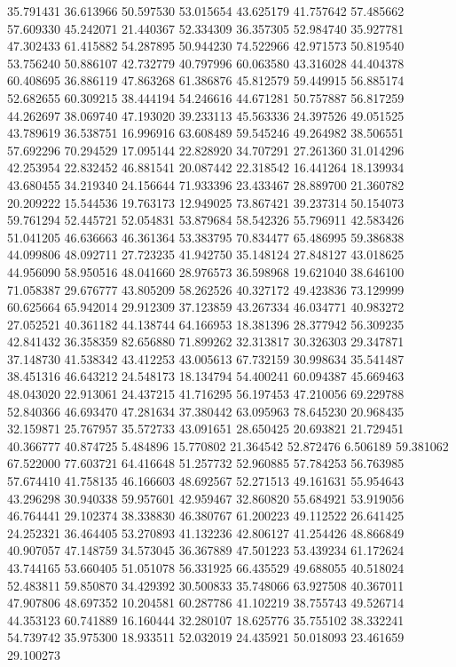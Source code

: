 35.791431
36.613966
50.597530
53.015654
43.625179
41.757642
57.485662
57.609330
45.242071
21.440367
52.334309
36.357305
52.984740
35.927781
47.302433
61.415882
54.287895
50.944230
74.522966
42.971573
50.819540
53.756240
50.886107
42.732779
40.797996
60.063580
43.316028
44.404378
60.408695
36.886119
47.863268
61.386876
45.812579
59.449915
56.885174
52.682655
60.309215
38.444194
54.246616
44.671281
50.757887
56.817259
44.262697
38.069740
47.193020
39.233113
45.563336
24.397526
49.051525
43.789619
36.538751
16.996916
63.608489
59.545246
49.264982
38.506551
57.692296
70.294529
17.095144
22.828920
34.707291
27.261360
31.014296
42.253954
22.832452
46.881541
20.087442
22.318542
16.441264
18.139934
43.680455
34.219340
24.156644
71.933396
23.433467
28.889700
21.360782
20.209222
15.544536
19.763173
12.949025
73.867421
39.237314
50.154073
59.761294
52.445721
52.054831
53.879684
58.542326
55.796911
42.583426
51.041205
46.636663
46.361364
53.383795
70.834477
65.486995
59.386838
44.099806
48.092711
27.723235
41.942750
35.148124
27.848127
43.018625
44.956090
58.950516
48.041660
28.976573
36.598968
19.621040
38.646100
71.058387
29.676777
43.805209
58.262526
40.327172
49.423836
73.129999
60.625664
65.942014
29.912309
37.123859
43.267334
46.034771
40.983272
27.052521
40.361182
44.138744
64.166953
18.381396
28.377942
56.309235
42.841432
36.358359
82.656880
71.899262
32.313817
30.326303
29.347871
37.148730
41.538342
43.412253
43.005613
67.732159
30.998634
35.541487
38.451316
46.643212
24.548173
18.134794
54.400241
60.094387
45.669463
48.043020
22.913061
24.437215
41.716295
56.197453
47.210056
69.229788
52.840366
46.693470
47.281634
37.380442
63.095963
78.645230
20.968435
32.159871
25.767957
35.572733
43.091651
28.650425
20.693821
21.729451
40.366777
40.874725
5.484896
15.770802
21.364542
52.872476
6.506189
59.381062
67.522000
77.603721
64.416648
51.257732
52.960885
57.784253
56.763985
57.674410
41.758135
46.166603
48.692567
52.271513
49.161631
55.954643
43.296298
30.940338
59.957601
42.959467
32.860820
55.684921
53.919056
46.764441
29.102374
38.338830
46.380767
61.200223
49.112522
26.641425
24.252321
36.464405
53.270893
41.132236
42.806127
41.254426
48.866849
40.907057
47.148759
34.573045
36.367889
47.501223
53.439234
61.172624
43.744165
53.660405
51.051078
56.331925
66.435529
49.688055
40.518024
52.483811
59.850870
34.429392
30.500833
35.748066
63.927508
40.367011
47.907806
48.697352
10.204581
60.287786
41.102219
38.755743
49.526714
44.353123
60.741889
16.160444
32.280107
18.625776
35.755102
38.332241
54.739742
35.975300
18.933511
52.032019
24.435921
50.018093
23.461659
29.100273
